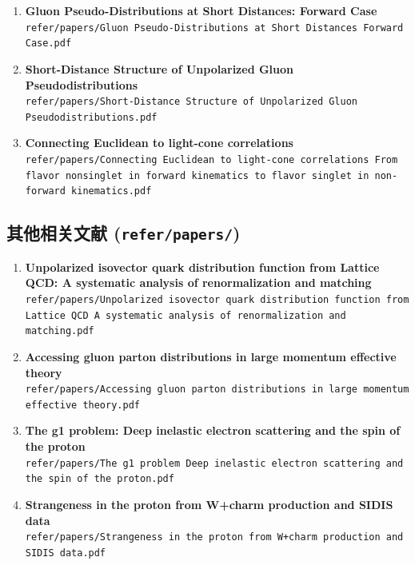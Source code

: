 \documentclass[12pt,a4paper]{ctexart}
\begin{document}
\begin{enumerate}
    \item \textbf{Gluon Pseudo-Distributions at Short Distances: Forward Case} \\
    \texttt{refer/papers/Gluon Pseudo-Distributions at Short Distances Forward Case.pdf}

    \item \textbf{Short-Distance Structure of Unpolarized Gluon Pseudodistributions} \\
    \texttt{refer/papers/Short-Distance Structure of Unpolarized Gluon Pseudodistributions.pdf}

    \item \textbf{Connecting Euclidean to light-cone correlations} \\
    \texttt{refer/papers/Connecting Euclidean to light-cone correlations From flavor nonsinglet in forward kinematics to flavor singlet in non-forward kinematics.pdf}
\end{enumerate}

\subsection{其他相关文献 (\texttt{refer/papers/})}

\begin{enumerate}
    \item \textbf{Unpolarized isovector quark distribution function from Lattice QCD: A systematic analysis of renormalization and matching} \\
    \texttt{refer/papers/Unpolarized isovector quark distribution function from Lattice QCD A systematic analysis of renormalization and matching.pdf}

    \item \textbf{Accessing gluon parton distributions in large momentum effective theory} \\
    \texttt{refer/papers/Accessing gluon parton distributions in large momentum effective theory.pdf}

    \item \textbf{The g1 problem: Deep inelastic electron scattering and the spin of the proton} \\
    \texttt{refer/papers/The g1 problem Deep inelastic electron scattering and the spin of the proton.pdf}

    \item \textbf{Strangeness in the proton from W+charm production and SIDIS data} \\
    \texttt{refer/papers/Strangeness in the proton from W+charm production and SIDIS data.pdf}
\end{enumerate}
\end{document}
